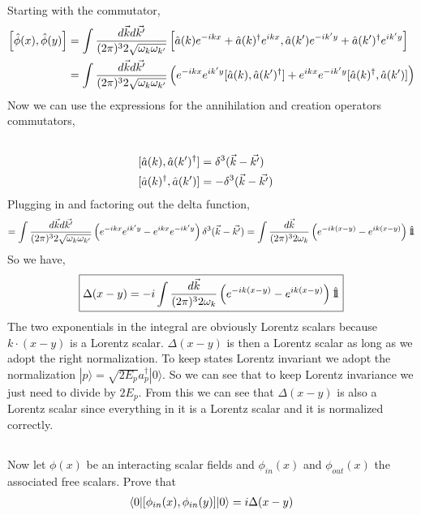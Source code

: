 \documentclass{article}
\numberwithin{equation}{section}
\newcommand{\beq}[1]{\begin{equation} \begin{aligned} #1 \end{aligned} \end{equation}}
\newcommand{\brkt}[3]{\langle #1 | #2 | #3 \rangle}
\begin{document}
Starting with the commutator,
\beq{
    \left[ \phix,\phiy \right] &= \intkk \left[ \ak e^{-ikx} + \akd e^{ikx}, \akp e^{-ik'y} + \akpd e^{ik'y}  \right] \\
    &= \intkk \left( e^{-ikx}e^{ik'y} [\ak,\akpd] + e^{ikx}e^{-ik'y}[\akd,\akp]       \right)
}
Now we can use the expressions for the annihilation and creation operators commutators,
\beq{
    \\ [\ak,\akpd] &= \delta^3(\vec{k} - \vec{k'}) \\
    [\akd,\akp] &= -\delta^3(\vec{k} - \vec{k'})
}
Plugging in and factoring out the delta function,
\beq{
    = \intkk \left(   e^{-ikx}e^{ik'y} - e^{ikx}e^{-ik'y}  \right) \delta^3(\vec{k} - \vec{k'})
    = \intk \left( e^{-ik(x-y)} - e^{ik(x-y)}       \right) \hat{1\!\!1}
}
So we have,
\beq{ \label{prop}
    \boxed{\Delta(x-y) = -i \intk \left( e^{-ik(x-y)} - e^{ik(x-y)}       \right)\hat{1\!\!1}}
}
The two exponentials in the integral are obviously Lorentz scalars because $k \cdot (x - y)$ is a Lorentz scalar. $\Delta(x-y)$ is then a Lorentz scalar as long 
as we adopt the right normalization. To keep states Lorentz invariant we adopt the normalization $|p \rangle = \sqrt{2 E_p} a_p^{\dagger} |0 \rangle$. So we can see
that to keep Lorentz invariance we just need to divide by $2 E_p$. From this we can see that $\Delta(x-y)$ is also a Lorentz scalar since everything in it is a Lorentz
scalar and it is normalized correctly.

\subsection{}
Now let $\phi(x)$ be an interacting scalar fields and $\phi_{in}(x)$ and $\phi_{out}(x)$ the associated free scalars. Prove that
\beq{
    \brkt{0}{[ \phinx, \phiny  ]}{0} = i \Delta(x-y)
}
\end{document}
